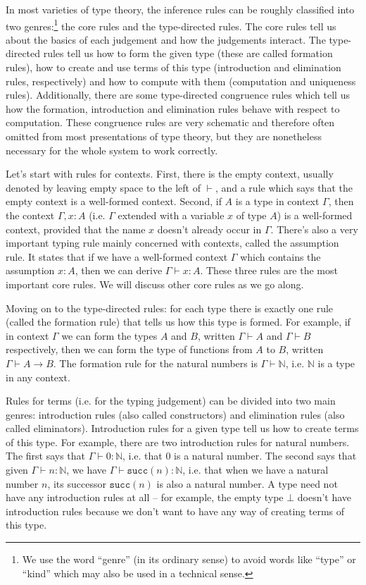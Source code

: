 \documentclass[declaration,mgr,english,shortabstract]{iithesis}
\newcommand{\m}[1]{\texttt{#1}}
\newcommand{\type}[2]{#1 \vdash #2}
\newcommand{\term}[3]{#1 \vdash #2 : #3}
\newcommand{\N}{\mathbb{N}}
\newcommand{\suc}[1]{\m{succ}(#1)}
\begin{document}
In most varieties of type theory, the inference rules can be roughly classified into two genres:\footnote{We use the word ``genre'' (in its ordinary sense) to avoid words like ``type'' or ``kind'' which may also be used in a technical sense.} the core rules and the type-directed rules. The core rules tell us about the basics of each judgement and how the judgements interact. The type-directed rules tell us how to form the given type (these are called formation rules), how to create and use terms of this type (introduction and elimination rules, respectively) and how to compute with them (computation and uniqueness rules). Additionally, there are some type-directed congruence rules which tell us how the formation, introduction and elimination rules behave with respect to computation. These congruence rules are very schematic and therefore often omitted from most presentations of type theory, but they are nonetheless necessary for the whole system to work correctly.

Let's start with rules for contexts. First, there is the empty context, usually denoted by leaving empty space to the left of $\vdash$, and a rule which says that the empty context is a well-formed context. Second, if $A$ is a type in context $\Gamma$, then the context $\Gamma, x : A$ (i.e. $\Gamma$ extended with a variable $x$ of type $A$) is a well-formed context, provided that the name $x$ doesn't already occur in $\Gamma$. There's also a very important typing rule mainly concerned with contexts, called the assumption rule. It states that if we have a well-formed context $\Gamma$ which contains the assumption $x : A$, then we can derive $\term{\Gamma}{x}{A}$. These three rules are the most important core rules. We will discuss other core rules as we go along.

Moving on to the type-directed rules: for each type there is exactly one rule (called the formation rule) that tells us how this type is formed. For example, if in context $\Gamma$ we can form the types $A$ and $B$, written $\type{\Gamma}{A}$ and $\type{\Gamma}{B}$ respectively, then we can form the type of functions from $A$ to $B$, written $\type{\Gamma}{A \to B}$. The formation rule for the natural numbers is $\type{\Gamma}{\N}$, i.e. $\N$ is a type in any context.

Rules for terms (i.e. for the typing judgement) can be divided into two main genres: introduction rules (also called constructors) and elimination rules (also called eliminators). Introduction rules for a given type tell us how to create terms of this type. For example, there are two introduction rules for natural numbers. The first says that $\term{\Gamma}{0}{\N}$, i.e. that $0$ is a natural number. The second says that given $\term{\Gamma}{n}{\N}$, we have $\term{\Gamma}{\suc{n}}{\N}$, i.e. that when we have a natural number $n$, its successor $\suc{n}$ is also a natural number. A type need not have any introduction rules at all -- for example, the empty type $\bot$ doesn't have introduction rules because we don't want to have any way of creating terms of this type.
\end{document}
